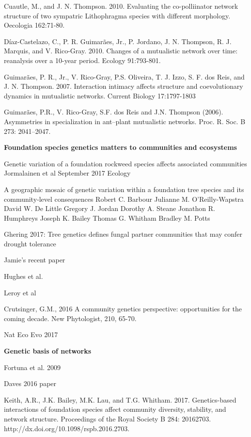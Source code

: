 \documentclass[fleqn,10pt]{wlscirep}
\begin{document}
Cuautle, M., and J. N. Thompson. 2010. Evaluating the co-polliinator
network structure of two sympatric Lithophragma species with different
morphology. Oecologia 162:71-80.

Díaz-Castelazo, C., P. R. Guimarães, Jr., P. Jordano, J. N. Thompson,
R. J. Marquis, and V. Rico-Gray. 2010. Changes of a mutualistic
network over time: reanalysis over a 10-year period. Ecology
91:793-801.

Guimarães, P. R., Jr., V. Rico-Gray, P.S. Oliveira, T. J. Izzo,
S. F. dos Reis, and J. N. Thompson. 2007. Interaction intimacy affects
structure and coevolutionary dynamics in mutualistic networks. Current
Biology 17:1797-1803

Guimarães, P.R., V. Rico-Gray, S.F. dos Reis and J.N. Thompson
(2006). Asymmetries in specialization in ant–plant mutualistic
networks. Proc. R. Soc. B 273: 2041–2047.


\textbf{Foundation species genetics matters to communities and ecosystems}

Genetic variation of a foundation rockweed species affects associated
communities Jormalainen et al September 2017 Ecology

A geographic mosaic of genetic variation within a foundation tree
species and its community‐level consequences
Robert C. Barbour  Julianne M. O'Reilly-Wapstra  David W. De Little
Gregory J. Jordan Dorothy A. Steane  Jonathon R. Humphreys  Joseph
K. Bailey  Thomas G. Whitham  Bradley M. Potts

Ghering 2017: Tree genetics defines fungal partner communities
  that may confer drought tolerance


Jamie's recent paper

Hughes et al.

Leroy et al

Crutsinger, G.M., 2016 A community genetics perspective: opportunities
for the coming decade. New Phytologist, 210, 65-70.

Nat Eco Evo 2017



\textbf{Genetic basis of networks}

Fortuna et al. 2009

Daves 2016 paper

Keith, A.R., J.K. Bailey, M.K. Lau, and T.G. Whitham.  2017.
Genetics-based interactions of foundation species affect community
diversity, stability, and network structure.  Proceedings of the Royal
Society B 284: 20162703. http://dx.doi.org/10.1098/rspb.2016.2703.
\end{document}
